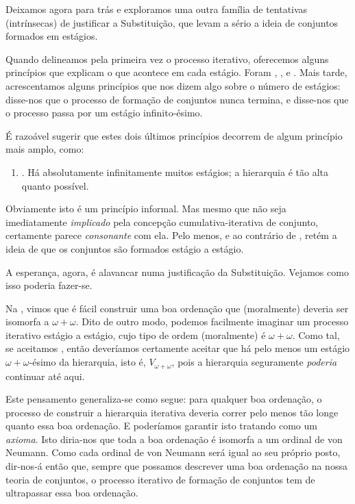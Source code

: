 \documentclass[../../../include/open-logic-section]{subfiles}
\begin{document}

Deixamos agora \limofsize{} para trás e exploramos uma outra
família de tentativas (intrínsecas) de justificar a Substituição, que levam a sério
a ideia de conjuntos formados em estágios.

Quando delineamos pela primeira vez o processo iterativo, oferecemos alguns
princípios que explicam o que acontece em cada estágio. Foram
\stageshier, \stagesord, e \stagesacc. Mais tarde, acrescentamos alguns
princípios que nos dizem algo sobre o número de estágios:
\stagessucc{} disse-nos que o processo de formação de conjuntos nunca termina,
e \stagesinf{} disse-nos que o processo passa por um estágio infinito-ésimo. 

É razoável sugerir que estes dois últimos princípios decorrem de
algum princípio mais amplo, como:
\begin{enumerate}
	\item[] \stagesinex. Há absolutamente infinitamente muitos estágios;
	a hierarquia é tão alta quanto possível.
\end{enumerate}
Obviamente isto é um princípio informal. Mas mesmo que não seja
imediatamente \emph{implicado} pela concepção cumulativa-iterativa de
conjunto, certamente parece \emph{consonante} com ela. Pelo menos,
e ao contrário de \limofsize, retém a ideia de que os conjuntos são formados
estágio a estágio. 

A esperança, agora, é alavancar \stagesinex{} numa justificação da
Substituição. Vejamos como isso poderia fazer-se. 

Na , vimos que é fácil
construir uma boa ordenação que (moralmente) deveria ser isomorfa a
$\omega+\omega$. Dito de outro modo, podemos facilmente imaginar um processo iterativo
estágio a estágio, cujo tipo de ordem (moralmente) é $\omega+\omega$. Como
tal, se aceitamos \stagesinex, então deveríamos certamente aceitar
que há pelo menos um estágio $\omega+\omega$-ésimo da hierarquia,
isto é, $V_{\omega+\omega}$, pois a hierarquia seguramente \emph{poderia}
continuar até aqui. 

Este pensamento generaliza-se como segue: para qualquer boa ordenação, o
processo de construir a hierarquia iterativa deveria correr pelo menos tão longe
quanto essa boa ordenação. E poderíamos garantir isto tratando
 como um
\emph{axioma}. Isto diria-nos que toda a boa ordenação é isomorfa
a um ordinal de von Neumann. Como cada ordinal de von Neumann será igual
ao seu próprio posto, 
dir-nos-á então que, sempre que possamos descrever uma boa ordenação na
nossa teoria de conjuntos, o processo iterativo de formação de conjuntos tem de ultrapassar essa
boa ordenação. 
\end{document}

